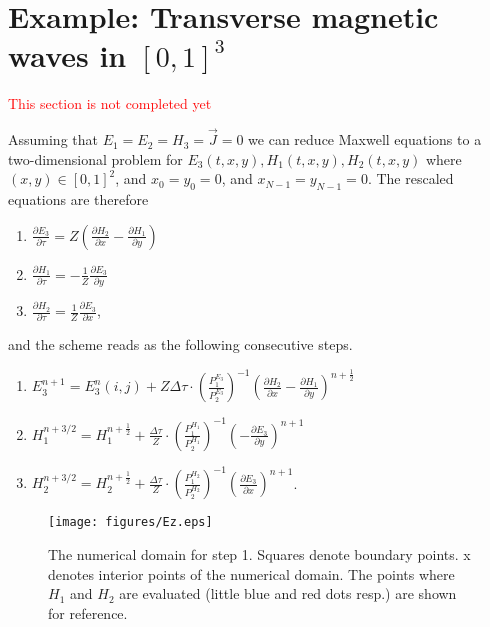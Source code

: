 \documentclass[12pt,reqno]{amsart}
\theoremstyle{definition}
\numberwithin{equation}{section}
\begin{document}
 

	

	\newpage
	\section{Example: Transverse magnetic waves  in $[0,1]^3$}\label{sec:TE}
	\textcolor{red}{This section is not completed yet}
	
	Assuming that $E_1=E_2=H_3=\vec{J}=0$ we can reduce Maxwell equations to a two-dimensional problem for $E_3(t,x,y), H_1(t,x,y), H_2(t,x,y)$ where  $(x,y)\in[0,1]^2$, and
	$x_0=y_0=0$, and $x_{N-1}=y_{N-1}=0$.
	The rescaled equations are therefore 
	
	\begin{enumerate}
		\item  $ \frac{\partial E_3}{\partial \tau }=Z\left (
		\frac{\partial H_2}{\partial x}-\frac{\partial H_1}{\partial y}
		\right)$
		\item 	  $ \frac{\partial H_1}{\partial \tau }=-\frac{1}{Z}\frac{\partial E_3}{\partial y}$
		\item 	  $ \frac{\partial H_2}{\partial \tau }=\frac{1}{Z}\frac{\partial E_3}{\partial x}$,
		
	\end{enumerate}
	and the scheme  reads as the following consecutive steps.
	\begin{enumerate}
		\item  $ E_3^{n+1}=E_3^n(i,j)+Z\Delta \tau \cdot 
		\left(\frac{P_1^{E_3}}{P_2^{E_3}}\right)^{-1}
		\left (\frac{\partial H_2}{\partial x}-
		\frac{\partial H_1}{\partial y}
		\right)^{n+\frac{1}{2}}$\\[1mm]
		\item $ H_1^{n+3/2}=H_1^{n+\frac{1}{2}}+\frac{\Delta \tau}{Z} \cdot  \left(\frac{P_1^{H_1}}{P_2^{H_1}}\right)^{-1}\left (-
		\frac{\partial E_3}{\partial y}
		\right)^{n+1} $\\[1mm]
		\item $ H_2^{n+3/2}=H_2^{n+\frac{1}{2}}+\frac{\Delta \tau}{Z} \cdot  \left(\frac{P_1^{H_2}}{P_2^{H_2}}\right)^{-1}\left (
		\frac{\partial E_3}{\partial x}
		\right)^{n+1} $.
	\end{enumerate}
	\begin{figure}[!t]
		\centering
		\texttt{[image: figures/Ez.eps]}
		\caption{
			The numerical domain for step 1.
			Squares denote boundary points. x denotes interior points of the numerical domain.  The points where $H_1$ and $H_2$ are evaluated (little blue and red dots resp.) are shown for reference.}
		\label{fig:E}
		
	\end{figure}
	
\end{document}
